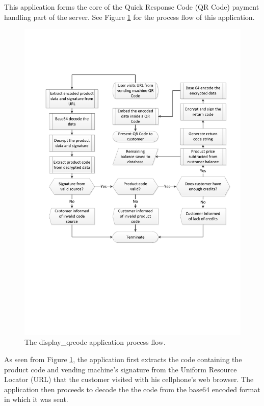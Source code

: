 This application forms the core of the Quick Response Code (QR Code) payment handling
part of the server. See Figure \ref{fig:disp-qrcode} for the process flow of
this application.

\begin{figure}
 \centering 
 \includegraphics[clip=true, trim = 0 250 0 120,
 scale=0.7]{qrcode_processflow_server_bak}
 \caption{The display\_qrcode application process flow.} 
 \label{fig:disp-qrcode}
\end{figure}

As seen from Figure \ref{fig:disp-qrcode}, the application first extracts the code
containing the product code and vending machine's signature from the Uniform
Resource Locator (URL) that the customer visited with his cellphone's web
browser. The application then proceeds to decode the the code from the base64 encoded
format in which it was sent.

